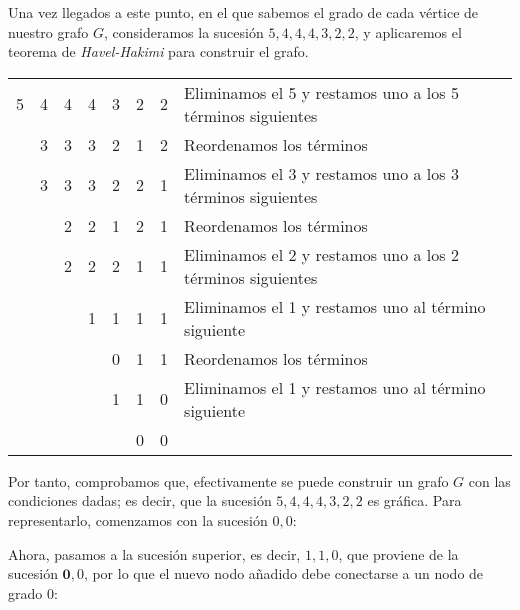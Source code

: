 \documentclass[12pt]{article}
\renewcommand{\bf}[1]{\mathbf{#1}}
\begin{document}
\begin{ejercicio}
        Una vez llegados a este punto, en el que sabemos el grado de cada vértice de nuestro grafo $G$,
        consideramos la sucesión $5,4,4,4,3,2,2$, y aplicaremos el teorema de \emph{Havel-Hakimi}
        para construir el grafo.
        \begin{table}[H]
            \centering
            \begin{tabular}{ccccccc|l}
                5 & 4 & 4 & 4 & 3 & 2 & 2 & Eliminamos el 5 y restamos uno a los 5 términos siguientes\\
                  & 3 & 3 & 3 & 2 & 1 & 2 & Reordenamos los términos\\
                  & 3 & 3 & 3 & 2 & 2 & 1 & Eliminamos el 3 y restamos uno a los 3 términos siguientes\\
                  &   & 2 & 2 & 1 & 2 & 1 & Reordenamos los términos\\
                  &   & 2 & 2 & 2 & 1 & 1 & Eliminamos el 2 y restamos uno a los 2 términos siguientes\\
                  &   &   & 1 & 1 & 1 & 1 & Eliminamos el 1 y restamos uno al término siguiente\\
                  &   &   &   & 0 & 1 & 1 & Reordenamos los términos\\
                  &   &   &   & 1 & 1 & 0 & Eliminamos el 1 y restamos uno al término siguiente\\
                  &   &   &   &   & 0 & 0 &
            \end{tabular}
        \end{table}

        Por tanto, comprobamos que, efectivamente se puede construir un grafo $G$ con las condiciones dadas; es decir,
        que la sucesión $5,4,4,4,3,2,2$ es gráfica. Para representarlo, comenzamos con
        la sucesión $0,0$:
        \begin{figure}[H]
            \centering
        \end{figure}

        Ahora, pasamos a la sucesión superior, es decir, $1,1,0$, que proviene de la sucesión $\bf{0}, 0$,
        por lo que el nuevo nodo añadido debe conectarse a un nodo de grado $0$:
        \begin{figure}[H]
            \centering
        \end{figure}


\end{ejercicio}
\end{document}
